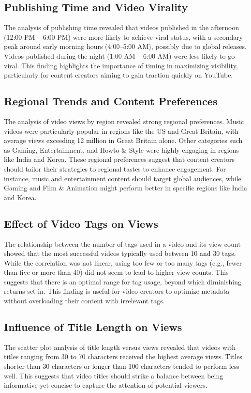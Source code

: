 \documentclass[a4paper]{article}
\begin{document}
\begin{multicols}{2}
\subsection{Publishing Time and Video Virality}
The analysis of publishing time revealed that videos published in the afternoon (12:00 PM – 6:00 PM) were more likely to achieve viral status, with a secondary peak around early morning hours (4:00–5:00 AM), possibly due to global releases. Videos published during the night (1:00 AM – 6:00 AM) were less likely to go viral. This finding highlights the importance of timing in maximizing visibility, particularly for content creators aiming to gain traction quickly on YouTube.

\subsection{Regional Trends and Content Preferences}
The analysis of video views by region revealed strong regional preferences. Music videos were particularly popular in regions like the US and Great Britain, with average views exceeding 12 million in Great Britain alone. Other categories such as Gaming, Entertainment, and Howto \& Style were highly engaging in regions like India and Korea. These regional preferences suggest that content creators should tailor their strategies to regional tastes to enhance engagement. For instance, music and entertainment content should target global audiences, while Gaming and Film \& Animation might perform better in specific regions like India and Korea.

\subsection{Effect of Video Tags on Views}
The relationship between the number of tags used in a video and its view count showed that the most successful videos typically used between 10 and 30 tags. While the correlation was not linear, using too few or too many tags (e.g., fewer than five or more than 40) did not seem to lead to higher view counts. This suggests that there is an optimal range for tag usage, beyond which diminishing returns set in. This finding is useful for video creators to optimize metadata without overloading their content with irrelevant tags.

\subsection{Influence of Title Length on Views}
The scatter plot analysis of title length versus views revealed that videos with titles ranging from 30 to 70 characters received the highest average views. Titles shorter than 30 characters or longer than 100 characters tended to perform less well. This suggests that video titles should strike a balance between being informative yet concise to capture the attention of potential viewers.


\end{multicols}
\end{document}
